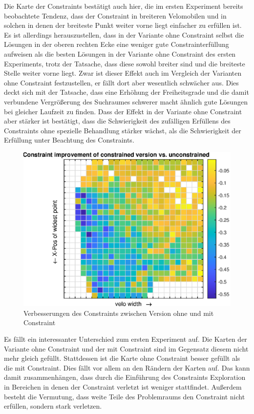 Die Karte der Constraints bestätigt auch hier, die im ersten Experiment bereits beobachtete Tendenz, dass der Constraint in breiteren Velomobilen und in solchen in denen der breiteste Punkt weiter vorne liegt einfacher zu erfüllen ist.
Es ist allerdings herauszustellen, dass in der Variante ohne Constraint selbst die Lösungen in der oberen rechten Ecke eine weniger gute Constrainterfüllung aufweisen als die besten Lösungen in der Variante ohne Constraint des ersten Experiments, trotz der Tatsache, dass diese sowohl breiter sind und die breiteste Stelle weiter vorne liegt.
Zwar ist dieser Effekt auch im Vergleich der Varianten ohne Constraint festzustellen, er fällt dort aber wesentlich schwächer aus.
Dies deckt sich mit der Tatsache, dass eine Erhöhung der Freiheitsgrade und die damit verbundene Vergrößerung des Suchraumes schwerer macht ähnlich gute Lösungen bei gleicher Laufzeit zu finden.
Dass der Effekt in der Variante ohne Constraint aber stärker ist bestätigt, dass die Schwierigkeit des zufälligen Erfüllens des Constraints ohne spezielle Behandlung stärker wächst, als die Schwierigkeit der Erfüllung unter Beachtung des Constraints.

\begin{figure}[h]
	\centering
	\includegraphics[width=.7\linewidth]{bilder/6pt500Samples/constraintImprovements}
	\caption{Verbesserungen des Constraints zwischen Version ohne und mit Constraint}
	\label{fig:2ndmapConCompare}
\end{figure}

Es fällt ein interessanter Unterschied zum ersten Experiment auf.
Die Karten der Variante ohne Constraint und der mit Constraint sind im Gegensatz diesem nicht mehr gleich gefüllt.
Stattdessen ist die Karte ohne Constraint besser gefüllt als die mit Constraint.
Dies fällt vor allem an den Rändern der Karten auf.
Das kann damit zusammenhängen, dass durch die Einführung des Constraints Exploration in Bereichen in denen der Constraint verletzt ist weniger stattfindet.
Außerdem besteht die Vermutung, dass weite Teile des Problemraums den Constraint nicht erfüllen, sondern stark verletzen.

